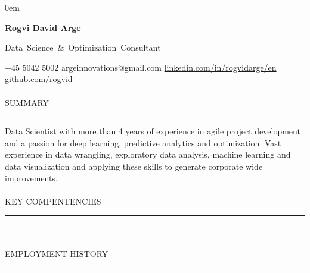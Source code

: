 \documentclass[12pt,a4paper]{article}
\newcommand{\headline}[1]{\Large \textcolor{myblue}{#1}}
\begin{document}
\parindent0em
\begin{center}
{\Huge \textcolor{myblue}{\textbf{Rogvi David Arge}} }\\
\vspace{0.2cm}

{\Large \mbox{Data Science \& Optimization Consultant}}
\end{center}

\vspace{0.1cm}
\footnotesize
+45 5042 5002 \hspace{0.5cm} argeinnovations@gmail.com \hspace{0.5cm} \url{linkedin.com/in/rogvidarge/en} \hspace{0.5cm} \url{github.com/rogvid} \\
\normalsize
\vspace{0.0cm}\\
{\headline{SUMMARY}}
\vspace{0.2cm}
{\color{myblue}\hrule height 0.3mm}
\vspace{0.2cm}
Data Scientist with more than 4 years of experience in agile project development and a passion for deep learning, predictive analytics and optimization. Vast experience in data wrangling, exploratory data analysis, machine learning and data visualization and applying these skills to generate corporate wide improvements.\\
\vspace{0.3cm}
\\
{\headline{KEY COMPENTENCIES}}
\vspace{0.2cm}
{\color{myblue}\hrule height 0.3mm}
\vspace{0.2cm}

\\
\vspace{0.3cm}
\\
{\headline{EMPLOYMENT HISTORY}}
\vspace{0.2cm}
{\color{myblue}\hrule height 0.3mm}
\vspace{0.2cm}
\end{document}
